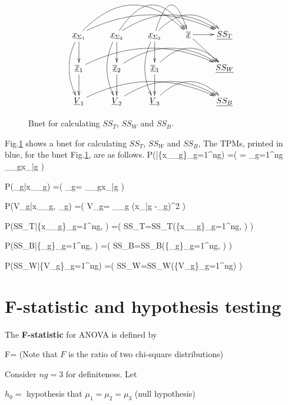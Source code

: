 \begin{figure}[h!]
$$\xymatrix{
\rvx_{\Sigma_1}
\ar@/^2pc/[rrrr]\ar@/^3pc/[rrr]
\ar[d]\ar@/_1pc/[dd]
&\rvx_{\Sigma_2}
\ar@/^2pc/[rrr]\ar@/^3pc/[rr]
\ar[d]\ar@/_1pc/[dd]
&\rvx_{\Sigma_3}
\ar@/^2pc/[rr]\ar@/^3pc/[r]
\ar[d]\ar@/_1pc/[dd]
&\ol{\rvx}\ar[r]\ar[rd]
&\ul{SS_T}
\\
\ol{\rvx}_1\ar@/^2pc/[rrrr]\ar[d]
&\ol{\rvx}_2\ar@/^2pc/[rrr]\ar[d]
&\ol{\rvx}_3\ar@/^2pc/[rr]\ar[d]
&
&\ul{SS_W}
\\
\ul{V}_1\ar@/^2pc/[rrrr]
&\ul{V}_2\ar@/^2pc/[rrr]
&\ul{V}_3\ar@/^2pc/[rr]
&
&\ul{SS_B}
}$$
\caption{Bnet 
for calculating $SS_T$, $SS_W$ and $SS_B$.}
\label{fig-bnet-ANOVA}
\end{figure}

Fig.\ref{fig-bnet-ANOVA}
shows a bnet for
calculating $SS_T$,
$SS_W$ and $SS_B$,
The TPMs, 
printed in blue,
for the bnet 
Fig.\ref{fig-bnet-ANOVA},
are as follows.
\beq\color{blue}
P(|\{x_{\Sigma_g}\}_{g=1}^{ng}) =\indi\left(
=
\sum_{g=1}^{ng}
\sum_{\s\in\Sigma_g}x_{\s|g}
\right)
\eeq


\beq\color{blue}
P(_g|x_{\Sigma_g}) =\indi\left(
_g=
\sum_{\s\in\Sigma_g}x_{\s|g}
\right)
\eeq

\beq\color{blue}
P(V_g|x_{\Sigma_g}, _g) =\indi\left(
V_g=
\sum_{\s\in\Sigma_g}
(x_{\s|g} -_g)^2
\right)
\eeq

\beq\color{blue}
P(SS_T|\{x_{\Sigma_g}\}_{g=1}^{ng},
) =\indi(
SS_T=SS_T(\{x_{\Sigma_g}\}_{g=1}^{ng},
)
)
\eeq

\beq\color{blue}
P(SS_B|\{_g\}_{g=1}^{ng},
) =\indi(
SS_B=SS_B(\{_g\}_{g=1}^{ng},
)
)
\eeq

\beq\color{blue}
P(SS_W|\{V_g\}_{g=1}^{ng}) =\indi(
SS_W=SS_W(\{V_g\}_{g=1}^{ng})
)
\eeq

\section{F-statistic and hypothesis testing}

The {\bf F-statistic} for ANOVA is defined by

\beq
F=\quad{}
\eeq
(Note that $F$ 
is the ratio of two chi-square
distributions)

Consider $ng=3$ for definiteness. Let

$h_0=$ hypothesis that $\mu_1=\mu_2=\mu_3$ (null hypothesis) 


